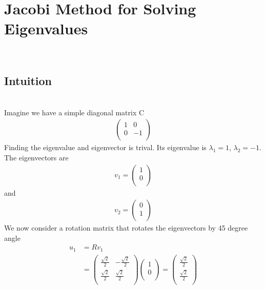 \documentclass[a4paper]{article}
\begin{document}
\section{Jacobi Method for Solving Eigenvalues}\\
\subsection{Intuition}\\
Imagine we have a simple diagonal matrix C\\
\begin{align*}
\left( \begin{array}{cc}
1 & 0\\
0 & -1\\
\end{array} \right)
\end{align*}
Finding the eigenvalue and eigenvector is trival. Its eigenvalue is $\lambda_1 = 1$, $\lambda_2 = -1$. The eigenvectors are
\begin{align*}
	v_1 = 
	\left(  \begin{array} {c}
		1 \\
		0 \\
	\end{array} \right) 
\end{align*}
and
\begin{align*}
	v_2 = 
	\left( \begin{array} {c}
		0 \\
		1 \\
	\end{array} \right) 
\end{align*}
We now consider a rotation matrix that rotates the eigenvectors by 45 degree angle
\begin{align*}
	u_1 & = R v_1 \\
	& =\left(  \begin{array} {cc}
		\frac{\sqrt{2}}{2}& -\frac{\sqrt{2}}{2}\\
		\frac{\sqrt{2}}{2}& \frac{\sqrt{2}}{2}\\
	\end{array} \right) 
	\left(  \begin{array} {c}
		1 \\
		0 \\
	\end{array} \right) 
	=
	\left(  \begin{array} {c}
		\frac{\sqrt{2}}{2} \\
		\frac{\sqrt{2}}{2} \\
	\end{array} \right) 
\end{align*}
\end{document}
